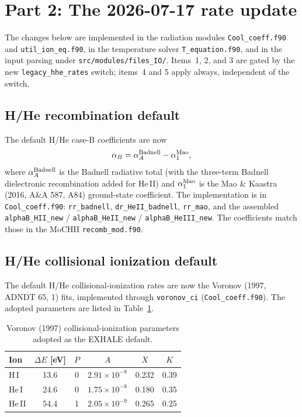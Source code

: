 \documentclass[english,a4paper]{my_memo}
\newcommand{\code}[1]{\texttt{#1}}
\begin{document}
\section{Part 2: The 2026-07-17 rate update}

The changes below are implemented in the radiation modules
\code{Cool\_coeff.f90} and \code{util\_ion\_eq.f90}, in the temperature
solver \code{T\_equation.f90}, and in the input parsing under
\code{src/modules/files\_IO/}. Items~1, 2, and 3 are gated by the new
\code{legacy\_hhe\_rates} switch; items~4 and 5 apply always, independent
of the switch.

\subsection{H/He recombination default}
The default H/He case-B coefficients are now
\begin{equation}
\alpha_B = \alpha_A^{\rm Badnell} - \alpha_1^{\rm Mao},
\end{equation}
where $\alpha_A^{\rm Badnell}$ is the Badnell radiative total (with the
three-term Badnell dielectronic recombination added for He\,II) and
$\alpha_1^{\rm Mao}$ is the Mao \& Kaastra (2016, A\&A 587, A84)
ground-state coefficient. The implementation is in
\code{Cool\_coeff.f90}: \code{rr\_badnell}, \code{dr\_HeII\_badnell},
\code{rr\_mao}, and the assembled \code{alphaB\_HII\_new} /
\code{alphaB\_HeII\_new} / \code{alphaB\_HeIII\_new}. The coefficients match
those in the MoCHII \code{recomb\_mod.f90}.

\subsection{H/He collisional ionization default}
The default H/He collisional-ionization rates are now the Voronov (1997,
ADNDT 65, 1) fits, implemented through \code{voronov\_ci}
(\code{Cool\_coeff.f90}). The adopted parameters are listed in
Table~\ref{tab:voronov}.

\begin{table}[htbp]
\centering
\small
\caption{Voronov (1997) collisional-ionization parameters adopted as the
EXHALE default.}
\label{tab:voronov}
\begin{tabular}{@{}lccccc@{}}
\toprule
Ion & $\Delta E$ [eV] & $P$ & $A$ & $X$ & $K$ \\
\midrule
H\,I   & 13.6 & 0 & $2.91\times10^{-8}$ & 0.232 & 0.39 \\
He\,I  & 24.6 & 0 & $1.75\times10^{-8}$ & 0.180 & 0.35 \\
He\,II & 54.4 & 1 & $2.05\times10^{-9}$ & 0.265 & 0.25 \\
\bottomrule
\end{tabular}
\end{table}
\end{document}
